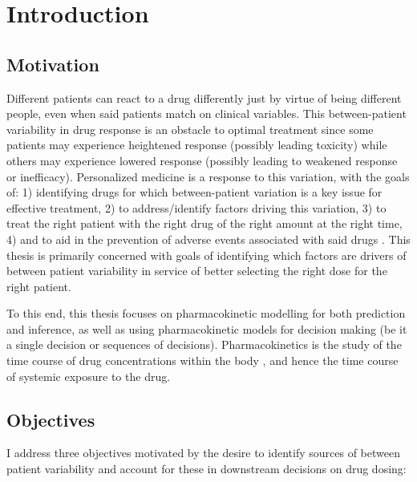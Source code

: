 \chapter{Introduction}

\section{Motivation}

Different patients can react to a drug differently just by virtue of being different people, even when said patients match on clinical variables.  This between-patient variability in drug response is an obstacle to optimal treatment since some patients may experience heightened response (possibly leading toxicity) while others may experience lowered response (possibly leading to weakened response or inefficacy).  Personalized medicine is a response to this variation, with the goals of: 1) identifying drugs for which between-patient variation is a key issue for effective treatment,  2) to address/identify factors driving this variation, 3) to treat the right patient with the right drug  of the right amount at the right time, 4) and to aid in the prevention of adverse events associated with said drugs \cite{morse2015personalized}.  This thesis is primarily concerned with goals of identifying which factors are drivers of between patient variability in service of better selecting the right dose for the right patient.

To this end, this thesis focuses on pharmacokinetic modelling for both prediction and inference, as well as using pharmacokinetic models for  decision making (be it a single decision or sequences of decisions). Pharmacokinetics is the study of the time course of drug concentrations within the body \cite{rosenbaum2016basic}, and hence the time course of systemic exposure to the drug.


\section{Objectives}

I address three objectives motivated by the desire to identify sources of between patient variability and account for these in downstream decisions on drug dosing:

